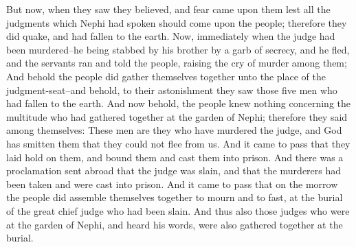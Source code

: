 But now, when they saw they believed, and fear came upon them lest all the judgments which Nephi had spoken should come upon the people; therefore they did quake, and had fallen to the earth.
\bverse \iffalse Now, immediately when the judge had been murdered--he being stabbed by his brother by a garb of secrecy, and he fled, and the servants ran and told the people, raising the cry of murder among them; \fi
Now, immediately when the judge had been murdered--he being stabbed by his brother by a garb of secrecy, and he fled, and the servants ran and told the people, raising the cry of murder among them;
\bverse \iffalse And behold the people did gather themselves together unto the place of the judgment-seat--and behold, to their astonishment they saw those five men who had fallen to the earth. \fi
And behold the people did gather themselves together unto the place of the judgment-seat--and behold, to their astonishment they saw those five men who had fallen to the earth.
\bverse \iffalse And now behold, the people knew nothing concerning the multitude who had gathered together at the garden of Nephi; therefore they said among themselves: These men are they who have murdered the judge, and God has smitten them that they could not flee from us. \fi
And now behold, the people knew nothing concerning the multitude who had gathered together at the garden of Nephi; therefore they said among themselves: These men are they who have murdered the judge, and God has smitten them that they could not flee from us.
\bverse \iffalse And it came to pass that they laid hold on them, and bound them and cast them into prison. And there was a proclamation sent abroad that the judge was slain, and that the murderers had been taken and were cast into prison. \fi
And it came to pass that they laid hold on them, and bound them and cast them into prison. And there was a proclamation sent abroad that the judge was slain, and that the murderers had been taken and were cast into prison.
\bverse \iffalse And it came to pass that on the morrow the people did assemble themselves together to mourn and to fast, at the burial of the great chief judge who had been slain. \fi
And it came to pass that on the morrow the people did assemble themselves together to mourn and to fast, at the burial of the great chief judge who had been slain.
\bverse \iffalse And thus also those judges who were at the garden of Nephi, and heard his words, were also gathered together at the burial. \fi
And thus also those judges who were at the garden of Nephi, and heard his words, were also gathered together at the burial.
